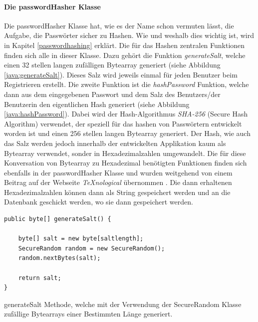 \documentclass[a4paper,11pt]{report}
\newenvironment{code}{\captionsetup{type=figure}}{}
\begin{document}
				\paragraph{Die passwordHasher Klasse}\label{passwordHasher}
				Die passwordHasher Klasse hat, wie es der Name schon vermuten lässt, die Aufgabe, die Passwörter sicher zu Hashen. Wie und weshalb dies wichtig ist, wird in Kapitel \ref{passwordhashing} erklärt. Die für das Hashen zentralen Funktionen finden sich alle in dieser Klasse. Dazu gehört die Funktion \emph{generateSalt}, welche einen 32 stellen langen zufälligen Bytearray generiert (siehe Abbildung \ref{java:generateSalt}). Dieses Salz wird jeweils einmal für jeden Benutzer beim Registrieren erstellt. Die zweite Funktion ist die \emph{hashPassword} Funktion, welche dann aus dem eingegebenen Passwort und dem Salz des Benutzers/der Benutzerin den eigentlichen Hash generiert (siehe Abbildung \ref{java:hashPassword}). Dabei wird der Hash-Algorithmus \emph{SHA-256} (Secure Hash Algorithm) verwendet, der speziell für das hashen von Passwörtern entwickelt worden ist und einen 256 stellen langen Bytearray generiert. Der Hash, wie auch das Salz werden jedoch innerhalb der entwickelten Applikation kaum als Bytearray verwendet, sonder in Hexadezimalzahlen umgewandelt. Die für diese Konversation von Bytearray zu Hexadezimal benötigten Funktionen finden sich ebenfalls in der passwordHasher Klasse und wurden weitgehend von einem Beitrag auf der Webseite \emph{TeXnological} übernommen \cite{TeXnological}. Die dann erhaltenen Hexadezimalzahlen können dann als String gespeichert werden und an die Datenbank geschickt werden, wo sie dann gespeichert werden.
				
\begin{code}
	\begin{center}
		\begin{verbatim}
public byte[] generateSalt() {

	byte[] salt = new byte[saltlength];
	SecureRandom random = new SecureRandom();
	random.nextBytes(salt);

	return salt;
}							
		\end{verbatim}
	\caption{generateSalt Methode, welche mit der Verwendung der SecureRandom Klasse zufällige Bytearrays einer Bestimmten Länge generiert.}\label{java:generateSalt}
	\end{center}
\end{code}
			
\end{document}
